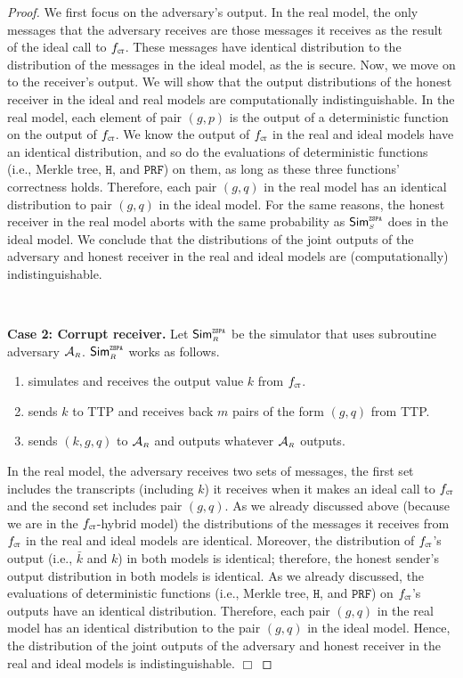 \begin{proof}
 We first focus on the adversary’s output. In the real model, the only messages that the adversary receives are those messages it receives as the result of the ideal call to $f_{\scriptscriptstyle \mathtt{CT}}$. These messages have identical distribution to the distribution of the messages in the ideal model, as the \ct is secure. Now, we move on to the receiver’s output. We will show that the output distributions of the honest receiver in the ideal and real models are computationally indistinguishable. In the real model,  each element of pair $(g, p)$ is the output of a deterministic function on the output of $f_{\scriptscriptstyle \mathtt{CT}}$. We know the output of $f_{\scriptscriptstyle \mathtt{CT}}$ in the real and ideal models have an identical distribution, and so do the evaluations of deterministic functions (i.e., Merkle tree, $\mathtt{H}$, and $\mathtt{PRF}$) on them, as long as these three functions' correctness holds. Therefore, each pair $(g,q)$ in the real model has an identical distribution to pair $(g,  q)$ in the ideal model.  For the same reasons, the honest receiver in the real model aborts with the same probability as  $\mathsf{Sim}^{\scriptscriptstyle \mathtt{ZSPA}}_{\scriptscriptstyle S}$ does in the ideal model.  We conclude that the distributions of the joint outputs of the adversary and honest receiver in the real and ideal models are  (computationally) indistinguishable. 

\


\noindent\textbf{Case 2: Corrupt receiver.}   Let $\mathsf{Sim}^{\scriptscriptstyle \mathtt{ZSPA}}_{\scriptscriptstyle R}$ be the simulator that uses subroutine adversary $\mathcal{A}_{\scriptscriptstyle R}$. $\mathsf{Sim}^{\scriptscriptstyle \mathtt{ZSPA}}_{\scriptscriptstyle R}$ works as follows. 

\begin{enumerate}
%
\item simulates   \ct  and receives the output value $ k$ from $f_{\scriptscriptstyle \mathtt{CT}}$.
%
\item sends $ k$ to TTP and receives back $m$ pairs of the form $( g,  q)$ from TTP. 
%
\item sends $( k,  g,  q)$ to $\mathcal{A}_{\scriptscriptstyle R}$ and outputs whatever  $\mathcal{A}_{\scriptscriptstyle R}$ outputs. 
%
 \end{enumerate}
 
 
In the real model, the adversary receives two sets of messages, the first set includes the transcripts (including $ k$) it receives when it makes an ideal call to $f_{\scriptscriptstyle \mathtt{CT}}$ and the second set includes pair $(g, q)$. As we already discussed above (because we are in the  $f_{\scriptscriptstyle \mathtt{CT}}$-hybrid model) the distributions of the messages it receives from $f_{\scriptscriptstyle \mathtt{CT}}$ in the real and ideal models are identical. Moreover, the distribution of $f_{\scriptscriptstyle \mathtt{CT}}$'s output (i.e., $\bar k$ and $k$) in both models is identical; therefore, the honest sender's output distribution in both models is identical. As we already discussed,  the evaluations of deterministic functions (i.e., Merkle tree, $\mathtt{H}$, and $\mathtt{PRF}$) on $f_{\scriptscriptstyle \mathtt{CT}}$'s outputs have an identical distribution. Therefore, each pair $(g, q)$ in the real model has an identical distribution to the pair $(g, q)$ in the ideal model.  Hence, the distribution of the joint outputs of the adversary and honest receiver in the real and ideal models is indistinguishable.
%
  \hfill\(\Box\)\end{proof}


